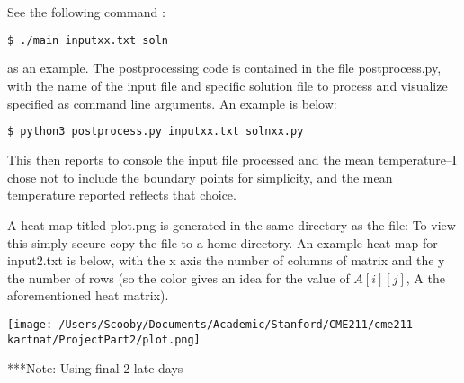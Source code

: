 \documentclass{article}
\begin{document}
\noindent See the following command :
\begin{lstlisting}[language=bash]
$ ./main inputxx.txt soln
\end{lstlisting}

\noindent as an example.  The postprocessing code is contained in the file postprocess.py, with the name of the input file and specific solution file to process and visualize specified as command line arguments.  An example is below:

\begin{lstlisting}[language=bash]
$ python3 postprocess.py inputxx.txt solnxx.py
\end{lstlisting}

This then reports to console the input file processed and the mean temperature--I chose not to include the boundary points for simplicity, and the mean temperature reported reflects that choice.

A heat map titled plot.png is generated in the same directory as the file:  To view this simply secure copy the file to a home directory.  An example heat map for input2.txt is below, with the x axis the number of columns of matrix and the y the number of rows (so the color gives an idea for the value of $A[i][j]$, A the aforementioned heat matrix).

\begin{center}
\texttt{[image: /Users/Scooby/Documents/Academic/Stanford/CME211/cme211-kartnat/ProjectPart2/plot.png]}
\end{center}
\vspace{8mm}

***Note: Using final 2 late days
\end{document}
